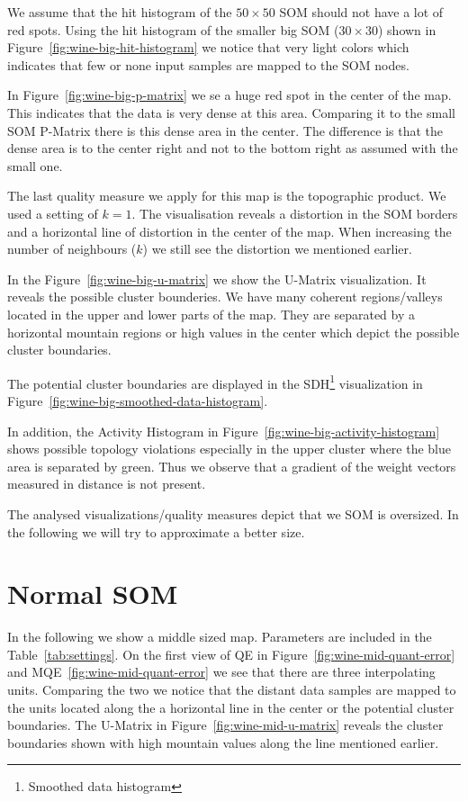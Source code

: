 \documentclass{acm_proc_article-sp}
\begin{document}
We assume that the hit histogram of the $50\times50$ SOM should not have a lot of red spots.
Using the hit histogram of the smaller big SOM ($30\times30$) shown in Figure~\ref{fig:wine-big-hit-histogram} we notice that very light
colors which indicates that few or none input samples are mapped to the SOM nodes.

In Figure~\ref{fig:wine-big-p-matrix} we se a huge red spot in the center of the map. This indicates that
the data is very dense at this area. Comparing it to the small SOM P-Matrix there is this dense area
in the center. The difference is that the dense area is to the center right and not to the bottom right as assumed with
the small one.

The last quality measure we apply for this map is the topographic product.
We used a setting of $k=1$. The visualisation reveals a distortion in the
SOM borders and a horizontal line of distortion in the center of the map.
When increasing the number of neighbours ($k$) we still see the distortion
we mentioned earlier.

In the Figure~\ref{fig:wine-big-u-matrix} we show the U-Matrix visualization.
It reveals the possible cluster bounderies. We have many coherent regions/valleys located in
the upper and lower parts of the map. They are separated by a horizontal mountain regions
or high values in the center which depict the possible cluster boundaries.

The potential cluster boundaries are displayed in the SDH\footnote{Smoothed data histogram} visualization in Figure~\ref{fig:wine-big-smoothed-data-histogram}.

In addition, the Activity Histogram in Figure~\ref{fig:wine-big-activity-histogram} shows possible
topology violations especially in the upper cluster where the blue area is separated by green. Thus we observe that a gradient of the weight vectors measured in distance is not present. 

The analysed visualizations/quality measures depict that we SOM is oversized.
In the following we will try to approximate a better size.

\section{Normal SOM}

In the following we show a middle sized map. Parameters are included in the Table~\ref{tab:settings}.
On the first view of QE in Figure~\ref{fig:wine-mid-quant-error} and MQE~\ref{fig:wine-mid-quant-error} we see
that there are three interpolating units. Comparing the two we notice that the distant data samples are
mapped to the units located along the a horizontal line in the center or the potential cluster boundaries.
The U-Matrix in Figure~\ref{fig:wine-mid-u-matrix} reveals the cluster boundaries shown with high mountain values
along the line mentioned earlier.
\end{document}
